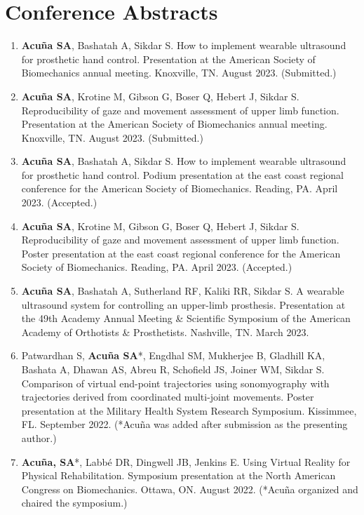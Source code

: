 \documentclass[letterpaper, 10pt]{article}
\begin{document}
\section{Conference Abstracts}
\begin{enumerate}
    \item \textbf{Acuña SA}, Bashatah A, Sikdar S. How to implement wearable ultrasound for prosthetic hand control. Presentation at the American Society of Biomechanics annual meeting. Knoxville, TN. August 2023. (Submitted.)
     \item \textbf{Acuña SA}, Krotine M, Gibson G, Boser Q, Hebert J, Sikdar S. Reproducibility of gaze and movement assessment of upper limb function. Presentation at the American Society of Biomechanics annual meeting. Knoxville, TN. August 2023. (Submitted.)
    \item \textbf{Acuña SA}, Bashatah A, Sikdar S. How to implement wearable ultrasound for prosthetic hand control. Podium presentation at the east coast regional conference for the American Society of Biomechanics. Reading, PA. April 2023. (Accepted.)
     \item \textbf{Acuña SA}, Krotine M, Gibson G, Boser Q, Hebert J, Sikdar S. Reproducibility of gaze and movement assessment of upper limb function. Poster presentation at the east coast regional conference for the American Society of Biomechanics. Reading, PA. April 2023. (Accepted.)
    \item \textbf{Acuña SA}, Bashatah A, Sutherland RF, Kaliki RR, Sikdar S. A wearable ultrasound system for controlling an upper-limb prosthesis. Presentation at the 49th Academy Annual Meeting \& Scientiﬁc Symposium of the American Academy of Orthotists \& Prosthetists. Nashville, TN. March 2023.
    \item Patwardhan S, \textbf{Acuña SA}*, Engdhal SM, Mukherjee B, Gladhill KA, Bashata A, Dhawan AS, Abreu R, Schofield JS, Joiner WM,  Sikdar S. Comparison of virtual end-point trajectories using sonomyography with trajectories derived from coordinated multi-joint movements. Poster presentation at the Military Health System Research Symposium. Kissimmee, FL. September 2022. (*Acuña was added after submission as the presenting author.)
    \item \textbf{Acuña, SA}*, Labbé DR, Dingwell JB, Jenkins E. Using Virtual Reality for Physical Rehabilitation. Symposium presentation at the North American Congress on Biomechanics. Ottawa, ON. August 2022. (*Acuña organized and chaired the symposium.)

\end{enumerate}
\end{document}
